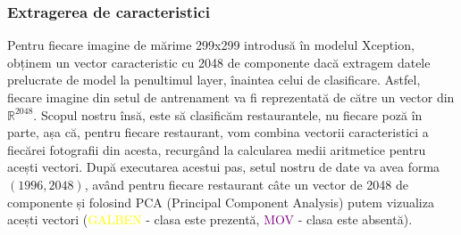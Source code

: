\subsubsection{Extragerea de caracteristici}
Pentru fiecare imagine de mărime 299x299 introdusă în modelul Xception, obținem un vector caracteristic cu 2048 de componente dacă extragem datele prelucrate de model la penultimul layer, înaintea celui de clasificare. Astfel, fiecare imagine din setul de antrenament va fi reprezentată de către un vector din $\mathbb{R}^{2048}$. Scopul nostru însă, este să clasificăm restaurantele, nu fiecare poză în parte, așa că, pentru fiecare restaurant, vom combina vectorii caracteristici a fiecărei fotografii din acesta, recurgând la calcularea medii aritmetice pentru acești vectori. După executarea acestui pas, setul nostru de date va avea forma $(1996,2048)$, având pentru fiecare restaurant câte un vector de 2048 de componente și folosind PCA (Principal Component Analysis) putem vizualiza acești vectori (\textcolor{yellow}{GALBEN} - clasa este prezentă, \textcolor{purple}{MOV} - clasa este absentă).

